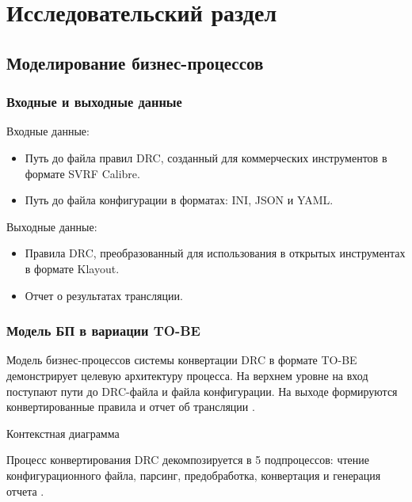\chapter{Исследовательский раздел}

\section{Моделирование бизнес-процессов}

\subsection{Входные и выходные данные}

Входные данные:

\begin{itemize}
	\item Путь до файла правил DRC,
		созданный для коммерческих инструментов в формате SVRF Calibre.
	\item Путь до файла конфигурации в форматах: INI, JSON и YAML.
\end{itemize}

Выходные данные:

\begin{itemize}
	\item Правила DRC, преобразованный для использования
		в открытых инструментах в формате Klayout.
	\item Отчет о результатах трансляции.
\end{itemize}

\subsection{Модель БП в вариации TO-BE}

Модель бизнес-процессов системы конвертации DRC
в формате TO-BE демонстрирует целевую архитектуру процесса.
На верхнем уровне на вход поступают пути до DRC-файла и файла конфигурации.
На выходе формируются конвертированные правила
и отчет об трансляции .

\begin{image}
	\caption{Контекстная диаграмма}
	\label{fig:idef0}
\end{image}

Процесс конвертирования DRC декомпозируется в 5 подпроцессов:
чтение конфигурационного файла, парсинг, предобработка, конвертация
и генерация отчета .

